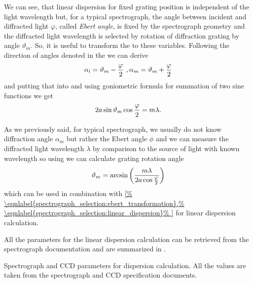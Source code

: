 We can see, that linear dispersion for fixed grating position is independent
of the light wavelength but, for a typical spectrograph, the angle between
incident and diffracted light $\varphi$, called \emph{Ebert angle}, is fixed by
the spectrograph geometry and the diffracted light wavelength is selected by
rotation of diffraction grating by angle $\vartheta_m$. So, it is useful to
transform the
to these variables. Following the direction of angles denoted in the
we can derive
\begin{equation}
	\alpha_\text{i} = \vartheta_m - \frac{\varphi}{2}\ ,
	\alpha_m = \vartheta_m + \frac{\varphi}{2}
	\label{\eqnlabel{spectrograph_selection:ebert_transformation}}
\end{equation}
and putting that into
and using goniometric formula for summation of two sine functions we get
\begin{equation}
	2a\sin\vartheta_m\cos\frac{\varphi}{2} = m\lambda.
	\label{\eqnlabel{spectrograph_selection:grating_equation_ebert}}
\end{equation}

As we previously said, for typical spectrograph, we usually do not know
diffraction angle $\alpha_m$ but rather the Ebert angle $\phi$ and we can
measure the diffracted light wavelength $\lambda$ by comparison to the source
of light with known wavelength so using
we can calculate grating rotation angle
\begin{equation}
	\vartheta_m = \text{arcsin}\left(
		\frac{m\lambda}{2a\cos\frac{\varphi}{2}}\right)
	\label{\eqnlabel{spectrograph_selection:grating_rotation_angle}}
\end{equation}
which can be used in combination with
\cref{%
	\eqnlabel{spectrograph_selection:ebert_transformation},%
	\eqnlabel{spectrograph_selection:linear_dispersion}%
}
for linear dispersion calculation.

All the parameters for the linear dispersion calculation can be retrieved from
the spectrograph documentation and are summarized in
.

\begin{table}
	\centering
	
	\caption{Spectrograph and CCD parameters for dispersion calculation. All the
		values are taken from the spectrograph and CCD specification documents.}
	\label{\tablabel{spectrograph_selection:dispersion_params}}
\end{table}

